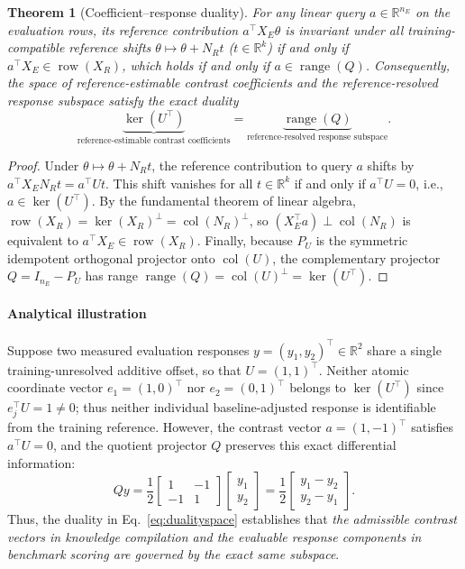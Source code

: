 \documentclass[preprint,12pt,number,sort&compress]{elsarticle}
\newtheorem{theorem}{Theorem}
\newcommand{\R}{\mathbb{R}}
\DeclareMathOperator{\col}{col}
\DeclareMathOperator{\row}{row}
\begin{document}
\begin{theorem}[Coefficient--response duality]\label{eq:duality}
For any linear query $a \in \R^{n_E}$ on the evaluation rows, its reference contribution $a^\top X_E \theta$ is invariant under all training-compatible reference shifts $\theta \mapsto \theta + N_R t$ ($t \in \R^k$) if and only if $a^\top X_E \in \row(X_R)$, which holds if and only if $a \in \operatorname{range}(Q)$. Consequently, the space of reference-estimable contrast coefficients and the reference-resolved response subspace satisfy the exact duality
\begin{equation}\label{eq:dualityspace}
\underbrace{\ker(U^\top)}_{\text{reference-estimable contrast coefficients}} = \underbrace{\operatorname{range}(Q)}_{\text{reference-resolved response subspace}}.
\end{equation}
\end{theorem}
\begin{proof}
Under $\theta \mapsto \theta + N_R t$, the reference contribution to query $a$ shifts by $a^\top X_E N_R t = a^\top U t$. This shift vanishes for all $t \in \R^k$ if and only if $a^\top U = 0$, i.e., $a \in \ker(U^\top)$. By the fundamental theorem of linear algebra, $\row(X_R) = \ker(X_R)^\perp = \col(N_R)^\perp$, so $(X_E^\top a) \perp \col(N_R)$ is equivalent to $a^\top X_E \in \row(X_R)$. Finally, because $P_U$ is the symmetric idempotent orthogonal projector onto $\col(U)$, the complementary projector $Q = I_{n_E} - P_U$ has range $\operatorname{range}(Q) = \col(U)^\perp = \ker(U^\top)$.
\end{proof}

\paragraph{Analytical illustration}
Suppose two measured evaluation responses $y = (y_1, y_2)^\top \in \R^2$ share a single training-unresolved additive offset, so that $U = (1, 1)^\top$. Neither atomic coordinate vector $e_1 = (1,0)^\top$ nor $e_2 = (0,1)^\top$ belongs to $\ker(U^\top)$ since $e_j^\top U = 1 \neq 0$; thus neither individual baseline-adjusted response is identifiable from the training reference. However, the contrast vector $a = (1, -1)^\top$ satisfies $a^\top U = 0$, and the quotient projector $Q$ preserves this exact differential information:
\[
Q y = \frac{1}{2}\begin{bmatrix} 1 & -1 \\ -1 & 1 \end{bmatrix}\begin{bmatrix} y_1 \\ y_2 \end{bmatrix} = \frac{1}{2}\begin{bmatrix} y_1 - y_2 \\ y_2 - y_1 \end{bmatrix}.
\]
Thus, the duality in Eq.~\eqref{eq:dualityspace} establishes that \emph{the admissible contrast vectors in knowledge compilation and the evaluable response components in benchmark scoring are governed by the exact same subspace}.
\end{document}
